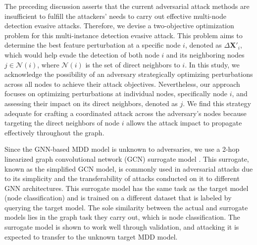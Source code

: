 \documentclass[conference,compsoc]{IEEEtran}
\begin{document}
\par The preceding discussion asserts that the current adversarial attack methods are insufficient to fulfill the attackers' needs to carry out effective multi-node detection evasive attacks. Therefore, we devise a two-objective optimization problem for this multi-instance detection evasive attack. This problem aims to determine the best feature perturbation at a specific node $i$, denoted as $\Delta \boldsymbol{X'}_i$, which would help evade the detection of both node $i$ and its neighboring nodes $j \in \mathcal{N}(i)$, where $\mathcal{N}(i)$ is the set of direct neighbors to $i$. In this study, we acknowledge the possibility of an adversary strategically optimizing perturbations across all nodes to achieve their attack objectives. Nevertheless, our approach focuses on optimizing perturbations at individual nodes, specifically node $i$, and assessing their impact on its direct neighbors, denoted as $j$. We find this strategy adequate for crafting a coordinated attack across the adversary's nodes because targeting the direct neighbors of node $i$ allows the attack impact to propagate effectively throughout the graph.


\par Since the GNN-based MDD model is unknown to adversaries, we use a 2-hop linearized graph convolutional network (GCN) surrogate model \cite{wu2019simplifying}. This surrogate, known as the simplified GCN model, is commonly used in adversarial attacks \cite{zugner2018adversarial,li2021adversarial,chen2022understanding,zhu2022resisting} due to its simplicity and the transferability of attacks conducted on it to different GNN architectures. This surrogate model has the same task as the target model (node classification) and is trained on a different dataset that is labeled by querying the target model. The sole similarity between the actual and surrogate models lies in the graph task they carry out, which is node classification. The surrogate model is shown to work well through validation, and attacking it is expected to transfer to the unknown target MDD model. 
\end{document}
